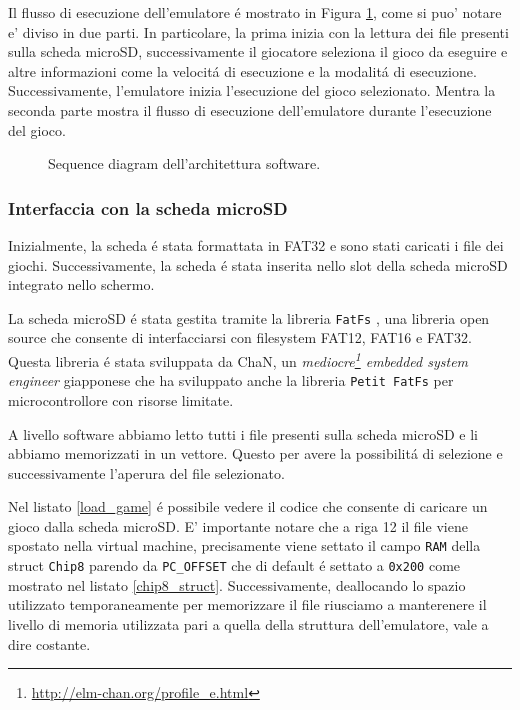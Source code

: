 \documentclass[a4paper]{article}
\begin{document}
Il flusso di esecuzione dell'emulatore é mostrato in Figura \ref{fig:sequence_diagram}, come si puo' notare e' diviso in due parti. In particolare, la prima inizia con la lettura dei file presenti sulla scheda microSD, successivamente il giocatore seleziona il gioco da eseguire e altre informazioni come la velocitá di esecuzione e la modalitá di esecuzione. Successivamente, l'emulatore inizia l'esecuzione del gioco selezionato. Mentra la seconda parte mostra il flusso di esecuzione dell'emulatore durante l'esecuzione del gioco.

\begin{figure}[h!t]
    \begin{center}
        
    \end{center}
    \caption{
        Sequence diagram dell'architettura software.
    }
    \label{fig:sequence_diagram}
\end{figure}

\subsubsection{Interfaccia con la scheda microSD}

Inizialmente, la scheda é stata formattata in FAT32 e sono stati caricati i file dei giochi. Successivamente, la scheda é stata inserita nello slot della scheda microSD integrato nello schermo.

\begin{Listing}[h!t] %
    \centering
    \caption{Caricamento di un gioco dalla scheda microSD.}
    \label{load_game}
\end{Listing}

La scheda microSD é stata gestita tramite la libreria \texttt{FatFs} \cite{elm-chan:fatfs}, una libreria open source che consente di interfacciarsi con filesystem FAT12, FAT16 e FAT32. Questa libreria é stata sviluppata da ChaN, un \textit{mediocre\footnote{\url{http://elm-chan.org/profile_e.html}} embedded system engineer} giapponese che ha sviluppato anche la libreria \texttt{Petit FatFs} per microcontrollore con risorse limitate.


A livello software abbiamo letto tutti i file presenti sulla scheda microSD e li abbiamo memorizzati in un vettore. Questo per avere la possibilitá di selezione e successivamente l'aperura del file selezionato.


Nel listato \ref{load_game} é possibile vedere il codice che consente di caricare un gioco dalla scheda microSD. E' importante notare che a riga 12 il file viene spostato nella virtual machine, precisamente viene settato il campo \texttt{RAM} della struct \texttt{Chip8} parendo da \texttt{PC\_OFFSET} che di default é settato a \texttt{0x200} come mostrato nel listato \ref{chip8_struct}. Successivamente, deallocando lo spazio utilizzato temporaneamente per memorizzare il file riusciamo a manterenere
il livello di memoria utilizzata pari a quella della struttura dell'emulatore, vale a dire costante.
\end{document}
